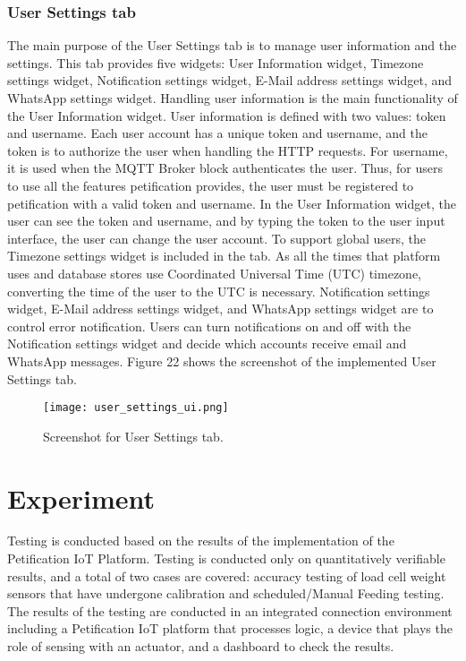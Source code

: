 \documentclass[conference]{IEEEtran}
\begin{document}
\subsubsection{User Settings tab}
The main purpose of the User Settings tab is to manage user information and the settings. This tab provides five widgets: User Information widget, Timezone settings widget, Notification settings widget, E-Mail address settings widget, and WhatsApp settings widget. Handling user information is the main functionality of the User Information widget. User information is defined with two values: token and username. Each user account has a unique token and username, and the token is to authorize the user when handling the HTTP requests. For username, it is used when the MQTT Broker block authenticates the user. Thus, for users to use all the features petification provides, the user must be registered to petification with a valid token and username. In the User Information widget, the user can see the token and username, and by typing the token to the user input interface, the user can change the user account.
\indent To support global users, the Timezone settings widget is included in the tab. As all the times that platform uses and database stores use Coordinated Universal Time (UTC) timezone, converting the time of the user to the UTC is necessary. Notification settings widget, E-Mail address settings widget, and WhatsApp settings widget are to control error notification. Users can turn notifications on and off with the Notification settings widget and decide which accounts receive email and WhatsApp messages. Figure 22
shows the screenshot of the implemented User Settings tab.

\begin{figure}[htbp]
\centerline{\texttt{[image: user\_settings\_ui.png]}}
\caption{Screenshot for User Settings tab.}
\label{fig}
\end{figure}
\section{Experiment}
Testing is conducted based on the results of the implementation of the Petification IoT Platform. Testing is conducted only on quantitatively verifiable results, and a total of two cases are covered: accuracy testing of load cell weight sensors that have undergone calibration and scheduled/Manual Feeding testing. The results of the testing are conducted in an integrated connection environment including a Petification IoT platform that processes logic, a device that plays the role of sensing with an actuator, and a dashboard to check the results.
\end{document}
